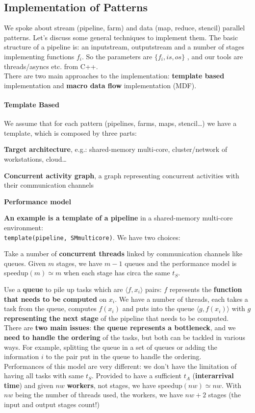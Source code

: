\documentclass[10pt]{report}
\begin{document}
\subsection{Implementation of Patterns}
We spoke about stream (pipeline, farm) and data (map, reduce, stencil) parallel patterns. Let's discuss some general techniques to implement them. The basic structure of a pipeline is: an inputstream, outputstream and a number of stages implementing functions $f_i$. So the parameters are $\{f_i, is, os\}$ , and our tools are threads/asyncs etc. from C++.\\
There are two main approaches to the implementation: \textbf{template based} implementation and \textbf{macro data flow} implementation (MDF).
\paragraph{Template Based} We assume that for each pattern (pipelines, farms, maps, stencil\ldots) we have a template, which is composed by three parts:
\begin{list}{}{}
	\item \textbf{Target architecture}, e.g.: shared-memory multi-core, cluster/network of workstations, cloud\ldots
	\item \textbf{Concurrent activity graph}, a graph representing concurrent activities with their communication channels
	\item \textbf{Performance model}
\end{list}
\textbf{An example is a template of a pipeline} in a shared-memory multi-core environment:\\
\texttt{template(pipeline, SMmulticore)}. We have two choices:
\begin{list}{}{}
	\item Take a number of \textbf{concurrent threads} linked by communication channels like queues. Given $m$ stages, we have $m-1$ queues and the performance model is speedup$(m)\simeq m$ when each stage has circa the same $t_S$.
	
	\item Use a \textbf{queue} to pile up tasks which are $\langle f, x_i\rangle$ pairs: $f$ represents the \textbf{function that needs to be computed} on $x_i$. We have a number of threads, each takes a task from the queue, computes $f(x_i)$ and puts into the queue $\langle g, f(x_i)\rangle$ with $g$ \textbf{representing the next stage} of the pipeline that needs to be computed.\\
	There are \textbf{two main issues}: \textbf{the queue represents a bottleneck}, and we \textbf{need to handle the ordering} of the tasks, but both can be tackled in various ways. For example, splitting the queue in a set of queues or adding the information $i$ to the pair put in the queue to handle the ordering.\\
	Performances of this model are very different: we don't have the limitation of having all tasks with same $t_S$. Provided to have a sufficient $t_A$ (\textbf{interarrival time}) and given $nw$ \textbf{workers}, not stages, we have speedup$(nw) \simeq nw$. With $nw$ being the number of threads used, the workers, we have $nw+2$ stages (the input and output stages count!)
\end{list}
\end{document}
